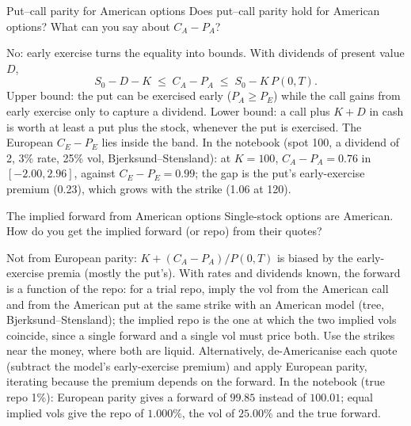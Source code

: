\begin{question}{\Theory \Practice {}}{Put--call parity for American options}
Does put--call parity hold for American options? What can you say about $C_A - P_A$?
\end{question}
\begin{answer}
No: early exercise turns the equality into bounds. With dividends of present value $D$,
\[
  S_0 - D - K \;\le\; C_A - P_A \;\le\; S_0 - K\,P(0,T).
\]
Upper bound: the put can be exercised early ($P_A \ge P_E$) while the call gains from early exercise only to capture a
dividend. Lower bound: a call plus $K + D$ in cash is worth at least a put plus the stock, whenever the put is
exercised. The European $C_E - P_E$ lies inside the band. In the notebook (spot 100, a dividend of 2, 3\% rate, 25\% vol,
Bjerksund--Stensland): at $K = 100$, $C_A - P_A = 0.76$ in $[-2.00, 2.96]$, against $C_E - P_E = 0.99$; the gap is
the put's early-exercise premium (0.23), which grows with the strike (1.06 at 120).
\end{answer}

\begin{question}{\Theory \Practice {}}{The implied forward from American options}
Single-stock options are American. How do you get the implied forward (or repo) from their quotes?
\end{question}
\begin{answer}
Not from European parity: $K + (C_A - P_A)/P(0,T)$ is biased by the early-exercise premia (mostly the put's). With
rates and dividends known, the forward is a function of the repo: for a trial repo, imply the vol from the American
call and from the American put at the same strike with an American model (tree, Bjerksund--Stensland); the implied repo
is the one at which the two implied vols coincide, since a single forward and a single vol must price both. Use the
strikes near the money, where both are liquid. Alternatively, de-Americanise each quote (subtract the model's
early-exercise premium) and apply European parity, iterating because the premium depends on the forward. In the
notebook (true repo 1\%): European parity gives a forward of $99.85$ instead of $100.01$; equal implied vols give the
repo of $1.000\%$, the vol of $25.00\%$ and the true forward.
\end{answer}

